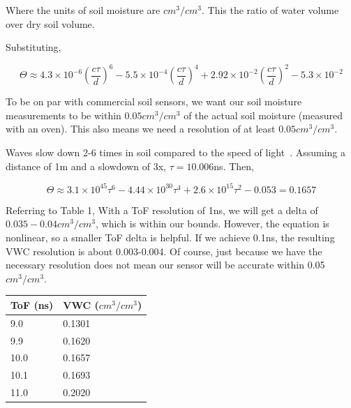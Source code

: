 \documentclass[12pt]{article}
\begin{document}
Where the units of soil moisture are $cm^3/cm^3$. This the ratio of water volume over dry soil volume.

Substituting,

\begin{equation}
  \Theta \approx 4.3\times 10^{-6} (\frac{c\tau}{d})^6-5.5\times10^{-4} (\frac{c\tau}{d})^4+2.92\times 10^{-2} (\frac{c\tau}{d})^2-5.3\times 10^{-2}
\end{equation}

To be on par with commercial soil sensors, we want our soil moisture
measurements to be within $0.05 cm^3/cm^3$ of the actual soil moisture
(measured with an oven). This also means we need a resolution of at
least $0.05 cm^3/cm^3$.

Waves slow down 2-6 times in soil compared to the speed of
light~\cite{gpr}. Assuming a distance of 1m and a slowdown of 3x,
$\tau = 10.006$ns. Then,

\begin{equation}
  \Theta \approx 3.1\times 10^{45}\tau^6-4.44\times 10^{30}\tau^4+2.6\times 10^{15}\tau^2-0.053 = 0.1657
\end{equation}

Referring to Table 1, With a ToF resolution of 1ns, we will get a
delta of $0.035-0.04 cm^3/cm^3$, which is within our bounds. However,
the equation is nonlinear, so a smaller ToF delta is helpful. If we
achieve 0.1ns, the resulting VWC resolution is about 0.003-0.004. Of
course, just because we have the necessary resolution does not mean
our sensor will be accurate within 0.05$cm^3/cm^3$.


\begin{table}[]
  \centering
\begin{tabular}{l|l}
\textbf{ToF (ns)} & \textbf{VWC ($cm^3/cm^3$)} \\ \hline
9.0               & 0.1301                                                      \\
9.9              & 0.1620                                                       \\
  10.0              & 0.1657                                                       \\
10.1              & 0.1693                                                       \\
11.0              & 0.2020                                                      
\end{tabular}
\end{table}
\end{document}

